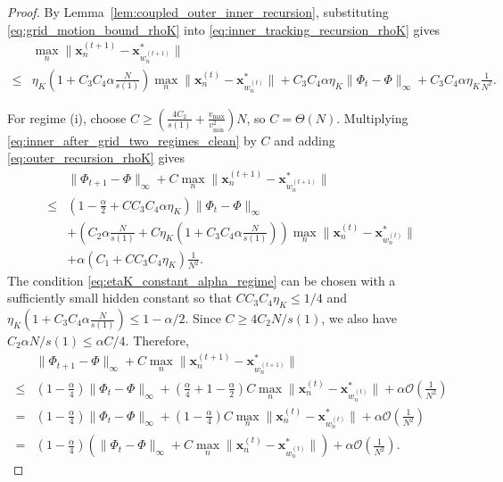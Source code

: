\documentclass{article}
\newcommand{\Oc}{\mathcal{O}}
\newcommand{\bx}{\mathbf{x}}
\newcommand{\Farc}{\Phi}
\begin{document}
\begin{proof}
By Lemma~\ref{lem:coupled_outer_inner_recursion}, substituting \eqref{eq:grid_motion_bound_rhoK} into \eqref{eq:inner_tracking_recursion_rhoK} gives
\begin{align}
&\max_n\|\bx_n^{(t+1)}-\bx_{w_n^{(t+1)}}^*\| \nonumber\\
\leq&
\eta_K\left(1+C_3C_4\alpha\frac{N}{s(1)}\right)\max_n\|\bx_n^{(t)}-\bx_{w_n^{(t)}}^*\|
+C_3C_4\alpha\eta_K\|\Farc_t-\Farc\|_\infty+C_3C_4\alpha\eta_K\frac1{N^2}.
\label{eq:inner_after_grid_two_regimes_clean}
\end{align}

For regime (i), choose $C\ge \left(\frac{4C_2}{s(1)}+\frac{v_{\max}}{v_{\min}^2}\right)N$, so $C=\Theta(N)$. Multiplying \eqref{eq:inner_after_grid_two_regimes_clean} by $C$ and adding \eqref{eq:outer_recursion_rhoK} gives
\begin{align}
&\|\Farc_{t+1}-\Farc\|_\infty+C\max_n\|\bx_n^{(t+1)}-\bx_{w_n^{(t+1)}}^*\| \nonumber\\
\leq&
\left(1-\frac{\alpha}{2}+CC_3C_4\alpha\eta_K\right)\|\Farc_t-\Farc\|_\infty \nonumber\\
&+\left(C_2\alpha\frac{N}{s(1)}+C\eta_K\left(1+C_3C_4\alpha\frac{N}{s(1)}\right)\right)\max_n\|\bx_n^{(t)}-\bx_{w_n^{(t)}}^*\| \nonumber\\
&+\alpha\left(C_1+CC_3C_4\eta_K\right)\frac1{N^2}.
\label{eq:constant_alpha_expand_clean}
\end{align}
The condition \eqref{eq:etaK_constant_alpha_regime} can be chosen with a sufficiently small hidden constant so that $CC_3C_4\eta_K\le 1/4$ and $\eta_K\left(1+C_3C_4\alpha\frac{N}{s(1)}\right)\le 1-\alpha/2$. Since $C\ge4C_2N/s(1)$, we also have $C_2\alpha N/s(1)\le \alpha C/4$. Therefore,
\begin{align}
&\|\Farc_{t+1}-\Farc\|_\infty+C\max_n\|\bx_n^{(t+1)}-\bx_{w_n^{(t+1)}}^*\| \nonumber\\
\leq&
\left(1-\frac{\alpha}{4}\right)\|\Farc_t-\Farc\|_\infty+\left(\frac{\alpha}{4}+1-\frac{\alpha}{2}\right)C\max_n\|\bx_n^{(t)}-\bx_{w_n^{(t)}}^*\|+\alpha\Oc\left(\frac1{N^2}\right) \nonumber\\
=&
\left(1-\frac{\alpha}{4}\right)\|\Farc_t-\Farc\|_\infty+\left(1-\frac{\alpha}{4}\right)C\max_n\|\bx_n^{(t)}-\bx_{w_n^{(t)}}^*\|+\alpha\Oc\left(\frac1{N^2}\right) \nonumber\\
=&
\left(1-\frac{\alpha}{4}\right)\left(\|\Farc_t-\Farc\|_\infty+C\max_n\|\bx_n^{(t)}-\bx_{w_n^{(t)}}^*\|\right)+\alpha\Oc\left(\frac1{N^2}\right).
\label{eq:constant_alpha_one_step_clean}

\end{align}
\end{proof}
\end{document}
